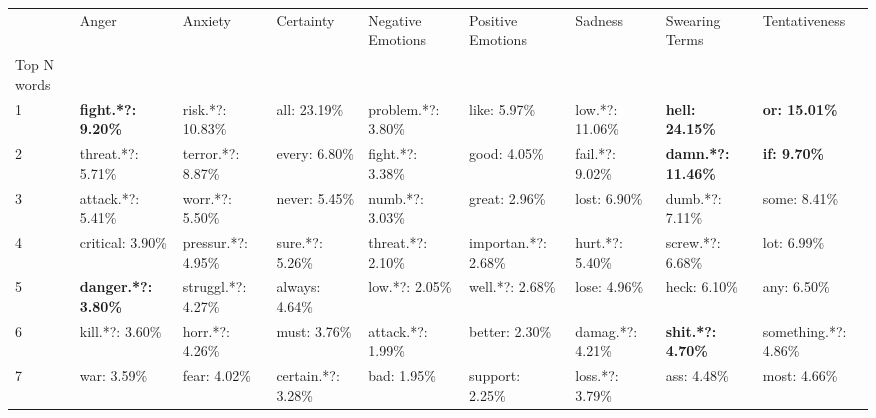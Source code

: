 \begin{table}[h]\centering
\begin{adjustbox}{width=\linewidth, center}
	\begin{tabular}{lllllllll}
	\toprule
	{} &                       Anger &               Anxiety &              Certainty &     Negative Emotions &    Positive Emotions &                Sadness &             Swearing Terms &         Tentativeness \\
	Top N words          &                             &                       &                        &                       &                      &                        &                            &                       \\
	\midrule
	1                    &   \textbf{fight.*?: 9.20\%} &      risk.*?: 10.83\% &           all: 23.19\% &    problem.*?: 3.80\% &         like: 5.97\% &        low.*?: 11.06\% &     \textbf{hell: 24.15\%} &  \textbf{or: 15.01\%} \\
	2                    &           threat.*?: 5.71\% &     terror.*?: 8.87\% &          every: 6.80\% &      fight.*?: 3.38\% &         good: 4.05\% &        fail.*?: 9.02\% &  \textbf{damn.*?: 11.46\%} &   \textbf{if: 9.70\%} \\
	3                    &           attack.*?: 5.41\% &       worr.*?: 5.50\% &          never: 5.45\% &       numb.*?: 3.03\% &        great: 2.96\% &           lost: 6.90\% &            dumb.*?: 7.11\% &          some: 8.41\% \\
	4                    &            critical: 3.90\% &    pressur.*?: 4.95\% &        sure.*?: 5.26\% &     threat.*?: 2.10\% &  importan.*?: 2.68\% &        hurt.*?: 5.40\% &           screw.*?: 6.68\% &           lot: 6.99\% \\
	5                    &  \textbf{danger.*?: 3.80\%} &    struggl.*?: 4.27\% &         always: 4.64\% &        low.*?: 2.05\% &      well.*?: 2.68\% &           lose: 4.96\% &               heck: 6.10\% &           any: 6.50\% \\
	6                    &             kill.*?: 3.60\% &       horr.*?: 4.26\% &           must: 3.76\% &     attack.*?: 1.99\% &       better: 2.30\% &       damag.*?: 4.21\% &   \textbf{shit.*?: 4.70\%} &  something.*?: 4.86\% \\
	7                    &                 war: 3.59\% &          fear: 4.02\% &     certain.*?: 3.28\% &           bad: 1.95\% &      support: 2.25\% &        loss.*?: 3.79\% &                ass: 4.48\% &          most: 4.66\% \\

\end{tabular}
\end{adjustbox}
\end{table}
